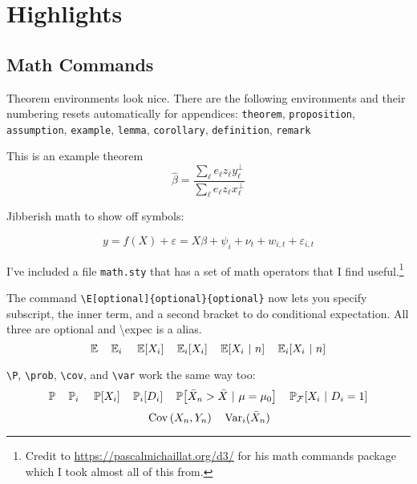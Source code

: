 \documentclass[12pt]{article}
\begin{document}
\section{Highlights}

\subsection{Math Commands}

Theorem environments look nice. There are the following environments and their numbering resets automatically for appendices: \texttt{theorem}, \texttt{proposition}, \texttt{assumption}, \texttt{example}, \texttt{lemma}, \texttt{corollary}, \texttt{definition}, \texttt{remark}

\begin{theorem}\label{thm:residue_thm}
  This is an example theorem \[
    \hat{\beta}=\frac{\sum_{\ell}e_{\ell}z_{\ell}y_{\ell}^{\perp}}{\sum_{\ell}e_{\ell}z_{\ell}x_{\ell}^{\perp}}
  \]
\end{theorem}

Jibberish math to show off symbols:

\begin{equation}\label{eq:fe_reg}
  y = f(X) + \varepsilon = X \beta + \psi_i + \nu_t + w_{i,t} + \varepsilon_{i,t}
\end{equation}

I've included a file \texttt{math.sty} that has a set of math operators that I find useful.\footnote{Credit to \url{https://pascalmichaillat.org/d3/} for his math commands package which I took almost all of this from.} 

The command \texttt{\textbackslash E[optional]\{optional\}\{optional\}} now lets you specify subscript, the inner term, and a second bracket to do conditional expectation. All three are optional and \textbackslash expec is a alias.
$$\E \quad \E[i] \quad \E{X_i} \quad \E[i]{X_i} \quad \E{X_i}{n} \quad \E[i]{X_i}{n}$$

\texttt{\textbackslash P}, \texttt{\textbackslash prob}, \texttt{\textbackslash cov}, and \texttt{\textbackslash var} work the same way too:
$$\P \quad \P[i] \quad \P{X_i} \quad \P[i]{D_i} \quad \P{\bar{X}_n > \bar{X}}{\mu = \mu_0} \quad \P[\mathcal{F}]{X_i}{D_i = 1}$$
$$\cov{X_n, Y_n} \quad \var[i](\bar{X}_n)$$
\end{document}
